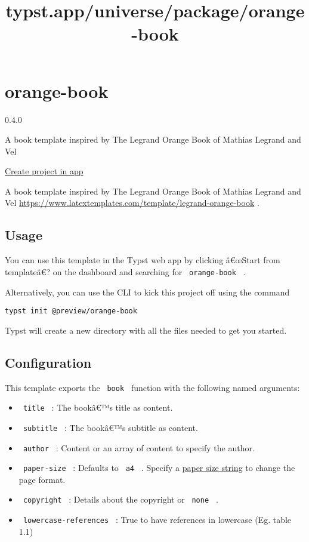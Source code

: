 \title{typst.app/universe/package/orange-book}

\label{banner}
\label{template-thumbnail}

\section{orange-book}\label{orange-book}

{ 0.4.0 }

A book template inspired by The Legrand Orange Book of Mathias Legrand
and Vel

\href{/app?template=orange-book&version=0.4.0}{Create project in app}

\label{readme}
A book template inspired by The Legrand Orange Book of Mathias Legrand
and Vel
\url{https://www.latextemplates.com/template/legrand-orange-book} .

\subsection{Usage}\label{usage}

You can use this template in the Typst web app by clicking â€œStart from
templateâ€? on the dashboard and searching for \texttt{\ orange-book\ }
.

Alternatively, you can use the CLI to kick this project off using the
command

\begin{verbatim}
typst init @preview/orange-book
\end{verbatim}

Typst will create a new directory with all the files needed to get you
started.

\subsection{Configuration}\label{configuration}

This template exports the \texttt{\ book\ } function with the following
named arguments:

\begin{itemize}
\tightlist
\item
  \texttt{\ title\ } : The bookâ€™s title as content.
\item
  \texttt{\ subtitle\ } : The bookâ€™s subtitle as content.
\item
  \texttt{\ author\ } : Content or an array of content to specify the
  author.
\item
  \texttt{\ paper-size\ } : Defaults to \texttt{\ a4\ } . Specify a
  \href{https://typst.app/docs/reference/layout/page/\#parameters-paper}{paper
  size string} to change the page format.
\item
  \texttt{\ copyright\ } : Details about the copyright or
  \texttt{\ none\ } .
\item
  \texttt{\ lowercase-references\ } : True to have references in
  lowercase (Eg. table 1.1)
\end{itemize}

